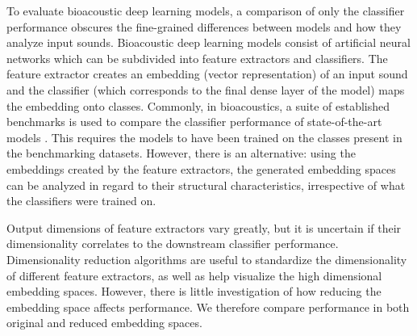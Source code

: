 
To evaluate bioacoustic deep learning models, a comparison of only the classifier performance obscures the fine-grained differences between models and how they analyze input sounds.
Bioacoustic deep learning models consist of artificial neural networks which can be subdivided into feature extractors and classifiers. 
The feature extractor creates an embedding (vector representation) of an input sound and the classifier (which corresponds to the final dense layer of the model) maps the embedding onto classes.
Commonly, in bioacoustics, a suite of established benchmarks is used to compare the classifier performance of state-of-the-art models \cite{hamer_birb_2023}.
This requires the models to have been trained on the classes present in the benchmarking datasets.
However, there is an alternative: using the embeddings created by the feature extractors, the generated embedding spaces can be analyzed in regard to their structural characteristics, irrespective of what the classifiers were trained on.

Output dimensions of feature extractors vary greatly, but it is uncertain if their dimensionality correlates to the downstream classifier performance. 
Dimensionality reduction algorithms are useful to standardize the dimensionality of different feature extractors, as well as help visualize the high dimensional embedding spaces.
However, there is little investigation of how reducing the embedding space affects performance.
We therefore compare performance in both original and reduced embedding spaces.

